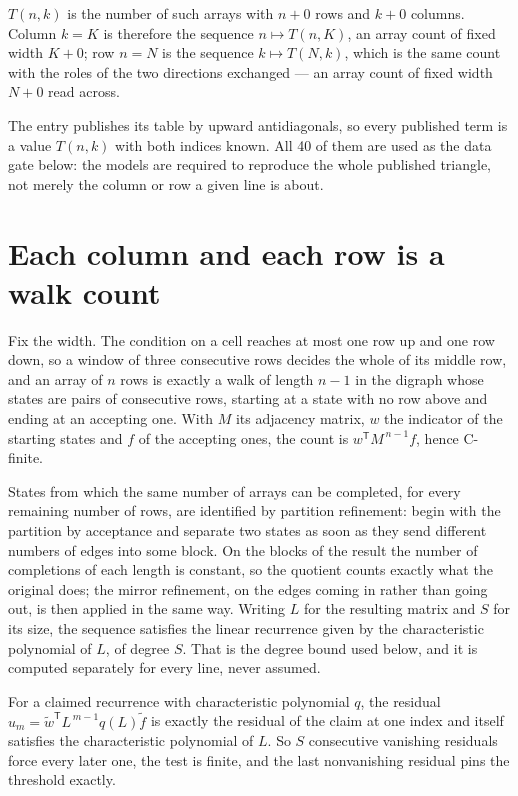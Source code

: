 \documentclass[11pt]{article}
\theoremstyle{definition}
\begin{document}
$T(n,k)$ is the number of such arrays with $n + 0$ rows and $k + 0$ columns. Column $k = K$ is therefore the sequence $n \mapsto T(n,K)$, an array count of fixed width $K + 0$; row $n = N$ is the sequence $k \mapsto T(N,k)$, which is the same count with the roles of the two directions exchanged --- an array count of fixed width $N + 0$ read across.

The entry publishes its table by upward antidiagonals, so every published term is a value $T(n,k)$ with both indices known. All 40 of them are used as the data gate below: the models are required to reproduce the whole published triangle, not merely the column or row a given line is about.

\section{Each column and each row is a walk count}

Fix the width. The condition on a cell reaches at most one row up and one row down, so a window of three consecutive rows decides the whole of its middle row, and an array of $n$ rows is exactly a walk of length $n-1$ in the digraph whose states are pairs of consecutive rows, starting at a state with no row above and ending at an accepting one. With $M$ its adjacency matrix, $w$ the indicator of the starting states and $f$ of the accepting ones, the count is $w^{\mathsf T}M^{\,n-1}f$, hence C-finite.

States from which the same number of arrays can be completed, for every remaining number of rows, are identified by partition refinement: begin with the partition by acceptance and separate two states as soon as they send different numbers of edges into some block. On the blocks of the result the number of completions of each length is constant, so the quotient counts exactly what the original does; the mirror refinement, on the edges coming in rather than going out, is then applied in the same way. Writing $L$ for the resulting matrix and $S$ for its size, the sequence satisfies the linear recurrence given by the characteristic polynomial of $L$, of degree $S$. That is the degree bound used below, and it is computed separately for every line, never assumed.

For a claimed recurrence with characteristic polynomial $q$, the residual $u_m = \tilde w^{\mathsf T}L^{\,m-1}q(L)\tilde f$ is exactly the residual of the claim at one index and itself satisfies the characteristic polynomial of $L$. So $S$ consecutive vanishing residuals force every later one, the test is finite, and the last nonvanishing residual pins the threshold exactly.
\end{document}
